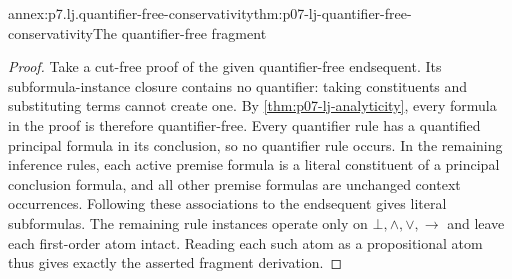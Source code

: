 \begin{annexitem}{annex:p7.lj.quantifier-free-conservativity}{thm:p07-lj-quantifier-free-conservativity}{The quantifier-free fragment}
\begin{proof}
Take a cut-free proof of the given quantifier-free endsequent.
Its subformula-instance closure contains no quantifier: taking
constituents and substituting terms cannot create one.  By
\ref{thm:p07-lj-analyticity}, every formula in the proof is therefore
quantifier-free.  Every quantifier rule has a quantified principal
formula in its conclusion, so no quantifier rule occurs.  In the
remaining inference rules, each active premise formula is a literal
constituent of a principal conclusion formula, and all other premise
formulas are unchanged context occurrences.  Following these
associations to the endsequent gives literal subformulas.  The
remaining rule instances operate only on \(\bot,\land,\lor,\to\)
and leave each first-order atom intact.  Reading each such atom as a
propositional atom thus gives exactly the asserted fragment derivation.
\end{proof}
\end{annexitem}
